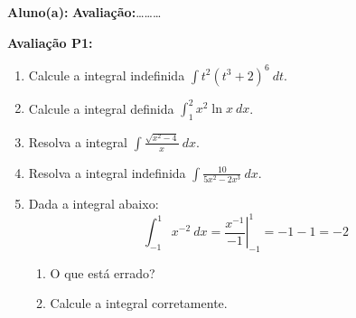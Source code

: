 \documentclass[a4paper,5pt]{amsbook}
\newcommand{\ds}{\displaystyle}
\begin{document}
\vspace{0.5cm}
{\bf Aluno(a):}\dotfill{} \textbf{Avalia\c{c}\~ao:}\ldots{}\ldots{}\ldots{}  %

\vspace{0.5cm}
\textbf{Avalia\c{c}\~ao P1:}
\begin{enumerate}
	\vspace{0.5cm}
	\item Calcule a integral indefinida $\ds\int t^2{(t^3+2)}^6\ dt$.
	\vspace{0.5cm}
	\item Calcule a integral definida $\ds\int_1^2 x^2\ln{x}\ dx$.
	\vspace{0.5cm}
	\item Resolva a integral $\ds\int \frac{\sqrt{x^2-4}}{x}\ dx$.
	\vspace{0.5cm}
	\item Resolva a integral indefinida $\ds\int \frac{10}{5x^2-2x^3}\ dx$.
	\vspace{0.5cm}
	\item Dada a integral abaixo:
		\[\int_{-1}^1 x^{-2}\ dx = \left.\frac{x^{-1}}{-1}\right|_{-1}^1 = -1 -1 = -2\]
		\begin{enumerate}
			\vspace{0.3cm}
			\item O que est\'a errado?
			\vspace{0.3cm}
			\item Calcule a integral corretamente.
		\end{enumerate}
\end{enumerate}
\end{document}
